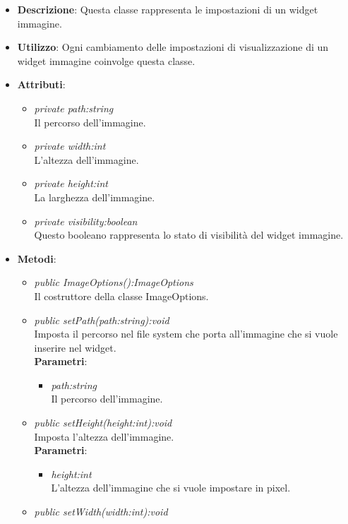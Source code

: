 \begin{itemize}
\item \textbf{Descrizione}: Questa classe rappresenta le impostazioni di un widget immagine.
\item \textbf{Utilizzo}: Ogni cambiamento delle impostazioni di visualizzazione di un widget immagine coinvolge questa classe.
\item \textbf{Attributi}:
	\begin{itemize}
	\item \textit{private path:string}\\
	Il percorso dell'immagine.
	\item \textit{private width:int}\\
	L'altezza dell'immagine. 
	\item \textit{private height:int}\\
	La larghezza dell'immagine.
	\item \textit{private visibility:boolean}\\
	Questo booleano rappresenta lo stato di visibilità del widget immagine.
	\end{itemize}
\item \textbf{Metodi}:
	\begin{itemize}
	\item \textit{public ImageOptions():ImageOptions}\\
	Il costruttore della classe ImageOptions.
	\item \textit{public setPath(path:string):void}\\
	Imposta il percorso nel file system che porta all'immagine che si vuole inserire nel widget.
		\\ \textbf{Parametri}: \begin{itemize}
		\item \textit{path:string}\\
		Il percorso dell'immagine.
		\end{itemize} 
	\item \textit{public setHeight(height:int):void}\\
	Imposta l'altezza dell'immagine.
		\\ \textbf{Parametri}: \begin{itemize}
		\item \textit{height:int}\\
		L'altezza dell'immagine che si vuole impostare  in pixel.
		\end{itemize} 
	\item \textit{public setWidth(width:int):void}\\

\end{itemize}
\end{itemize}
